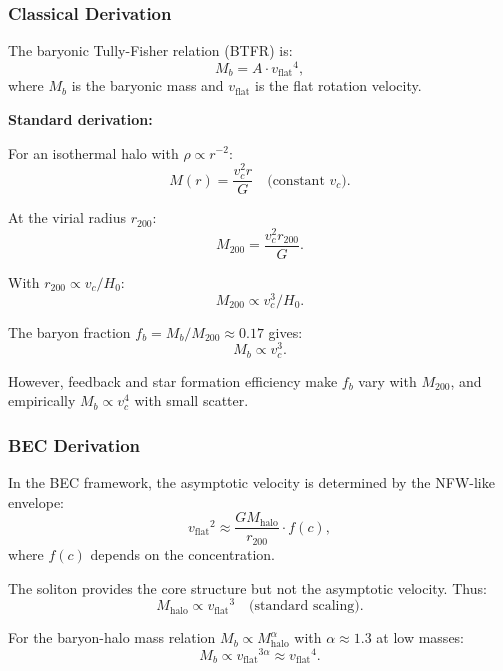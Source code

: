 \documentclass[11pt,a4paper]{article}
\newcommand{\Mhalo}{\ensuremath{M_{\mathrm{halo}}}}
\newcommand{\vflat}{\ensuremath{v_{\mathrm{flat}}}}
\theoremstyle{definition}
\theoremstyle{remark}
\begin{document}
\subsubsection{Classical Derivation}

The baryonic Tully-Fisher relation (BTFR) is:
\begin{equation}
M_b = A \cdot \vflat^4,
\end{equation}
where $M_b$ is the baryonic mass and $\vflat$ is the flat rotation velocity.

\textbf{Standard derivation:}

For an isothermal halo with $\rho \propto r^{-2}$:
\begin{equation}
M(r) = \frac{v_c^2 r}{G} \quad \text{(constant } v_c\text{)}.
\end{equation}

At the virial radius $r_{200}$:
\begin{equation}
M_{200} = \frac{v_c^2 r_{200}}{G}.
\end{equation}

With $r_{200} \propto v_c / H_0$:
\begin{equation}
M_{200} \propto v_c^3 / H_0.
\end{equation}

The baryon fraction $f_b = M_b/M_{200} \approx 0.17$ gives:
\begin{equation}
M_b \propto v_c^3.
\end{equation}

However, feedback and star formation efficiency make $f_b$ vary with $M_{200}$, and empirically $M_b \propto v_c^4$ with small scatter.

\subsubsection{BEC Derivation}

In the BEC framework, the asymptotic velocity is determined by the NFW-like envelope:
\begin{equation}
\vflat^2 \approx \frac{G \Mhalo}{r_{200}} \cdot f(c),
\end{equation}
where $f(c)$ depends on the concentration.

The soliton provides the core structure but not the asymptotic velocity. Thus:
\begin{equation}
\Mhalo \propto \vflat^3 \quad \text{(standard scaling)}.
\end{equation}

For the baryon-halo mass relation $M_b \propto M_{\mathrm{halo}}^\alpha$ with $\alpha \approx 1.3$ at low masses:
\begin{equation}
M_b \propto \vflat^{3\alpha} \approx \vflat^4.
\end{equation}
\end{document}
